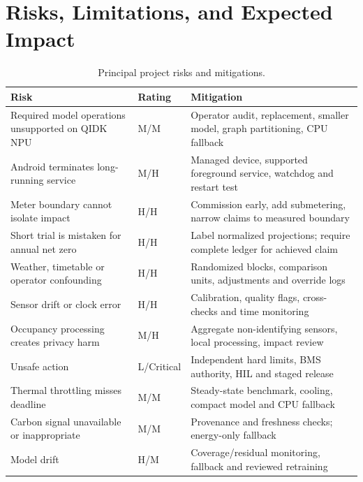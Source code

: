 \section{Risks, Limitations, and Expected Impact}

\begin{table}[t]
	\centering
	\caption{Principal project risks and mitigations.}
	\label{tab:risks}
	\begin{tabularx}{\textwidth}{p{}p{}X}
		\toprule
		Risk                                               & Rating     & Mitigation                                                                   \\
		\midrule
		Required model operations unsupported on QIDK NPU  & M/M        & Operator audit, replacement, smaller model, graph partitioning, CPU fallback \\
		Android terminates long-running service            & M/H        & Managed device, supported foreground service, watchdog and restart test      \\
		Meter boundary cannot isolate impact               & H/H        & Commission early, add submetering, narrow claims to measured boundary        \\
		Short trial is mistaken for annual net zero        & H/H        & Label normalized projections; require complete ledger for achieved claim     \\
		Weather, timetable or operator confounding         & H/H        & Randomized blocks, comparison units, adjustments and override logs           \\
		Sensor drift or clock error                        & H/H        & Calibration, quality flags, cross-checks and time monitoring                 \\
		Occupancy processing creates privacy harm          & M/H        & Aggregate non-identifying sensors, local processing, impact review           \\
		Unsafe action                                      & L/Critical & Independent hard limits, BMS authority, HIL and staged release               \\
		Thermal throttling misses deadline                 & M/M        & Steady-state benchmark, cooling, compact model and CPU fallback              \\
		Carbon signal unavailable or inappropriate         & M/M        & Provenance and freshness checks; energy-only fallback                        \\
		Model drift                                        & H/M        & Coverage/residual monitoring, fallback and reviewed retraining               \\

\end{tabularx}
\end{table}
